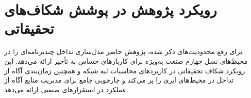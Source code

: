 \section{رویکرد پژوهش در پوشش شکاف‌های تحقیقاتی}

برای رفع محدودیت‌های ذکر شده، پژوهش حاضر مدل‌سازی تداخل چندبرنامه‌ای را در محیط‌های  نسل چهارم صنعت به‌ویژه برای کاربارهای حساس به تأخیر ارائه می‌دهد. این رویکرد شکاف تحقیقاتی در کاربردهای محاسبات لبه شبکه و همچنین زمان‌بندی آگاه از تداخل در محیط‌های ابری را پر می‌کند و چارچوبی جامع برای مدیریت منابع آگاه از عملکرد در استقرارهای صنعتی  ارائه می‌دهد.